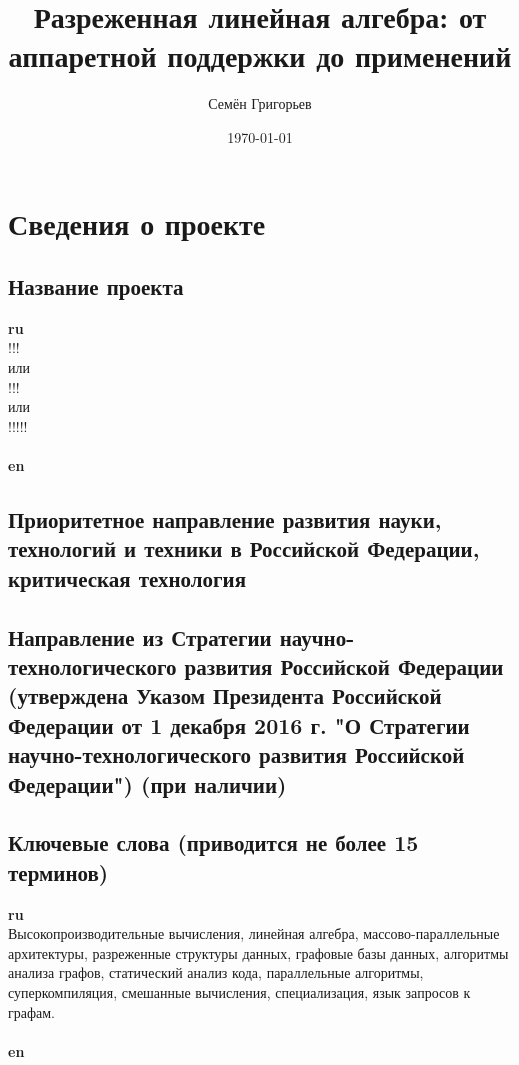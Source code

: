 \documentclass[12pt]{article}  %
\title{Разреженная линейная алгебра: от аппаретной поддержки до применений}
\author{Семён Григорьев}
\date{\today}
\theoremstyle{remark}
\begin{document}

\maketitle

\section{Сведения о проекте}

\subsection{Название проекта}

\textbf{ru}\\
%
!!!
\\
или
\\
!!!
\\
или
\\
!!!!!
\\
\\
\textbf{en}\\


\subsection{Приоритетное направление развития науки, технологий и техники в Российской Федерации, критическая технология}
%


\subsection{Направление из Стратегии научно-технологического развития Российской Федерации (утверждена Указом Президента Российской Федерации от 1 декабря 2016 г.  "О Стратегии научно-технологического развития Российской Федерации") (при наличии)}
%

\subsection{Ключевые слова (приводится не более 15 терминов)}

\textbf{ru}\\
%
Высокопроизводительные вычисления, линейная алгебра, массово-параллельные архитектуры, разреженные структуры данных, графовые базы данных, алгоритмы анализа графов, статический анализ кода, параллельные алгоритмы, суперкомпиляция, смешанные вычисления, специализация, язык запросов к графам.
\\
\\
\textbf{en}\\
\end{document}
